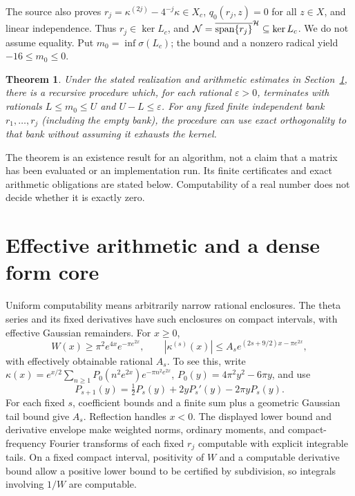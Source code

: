 \documentclass[11pt]{article}
\newtheorem{theorem}{Theorem}[section]\newtheorem{lemma}[theorem]{Lemma}\newtheorem{proposition}[theorem]{Proposition}
\begin{document}
The source also proves $r_j=\kappa^{(2j)}-4^{-j}\kappa\in X_c$, $q_0(r_j,z)=0$ for all $z\in X$, and linear independence. Thus $r_j\in\ker L_c$, and $\mathcal N=\overline{\operatorname{span}\{r_j\}}^{\mathcal H}\subseteq\ker L_c$. We do not assume equality. Put $m_0=\inf\sigma(L_c)$; the bound and a nonzero radical yield $-16\le m_0\le0$.

\begin{theorem}\label{main}
Under the stated realization and arithmetic estimates in Section~\ref{arithmetic}, there is a recursive procedure which, for each rational $\varepsilon>0$, terminates with rationals $L\le m_0\le U$ and $U-L\le\varepsilon$. For any fixed finite independent bank $r_1,\ldots,r_j$ (including the empty bank), the procedure can use exact orthogonality to that bank without assuming it exhausts the kernel.
\end{theorem}
The theorem is an existence result for an algorithm, not a claim that a matrix has been evaluated or an implementation run. Its finite certificates and exact arithmetic obligations are stated below. Computability of a real number does not decide whether it is exactly zero.

\section{Effective arithmetic and a dense form core}\label{arithmetic}
Uniform computability means arbitrarily narrow rational enclosures. The theta series and its fixed derivatives have such enclosures on compact intervals, with effective Gaussian remainders. For $x\ge0$,
\begin{equation}\label{theta}
 W(x)\ge\pi^2e^{4x}e^{-\pi e^{2x}},\qquad |\kappa^{(s)}(x)|\le A_s e^{(2s+9/2)x-\pi e^{2x}},
\end{equation}
with effectively obtainable rational $A_s$. To see this, write $\kappa(x)=e^{x/2}\sum_{n\ge1}P_0(n^2e^{2x})e^{-\pi n^2e^{2x}}$, $P_0(y)=4\pi^2y^2-6\pi y$, and use
\[P_{s+1}(y)=\tfrac12P_s(y)+2yP_s'(y)-2\pi yP_s(y).
\]
For each fixed $s$, coefficient bounds and a finite sum plus a geometric Gaussian tail bound give $A_s$. Reflection handles $x<0$. The displayed lower bound and derivative envelope make weighted norms, ordinary moments, and compact-frequency Fourier transforms of each fixed $r_j$ computable with explicit integrable tails. On a fixed compact interval, positivity of $W$ and a computable derivative bound allow a positive lower bound to be certified by subdivision, so integrals involving $1/W$ are computable.
\end{document}
